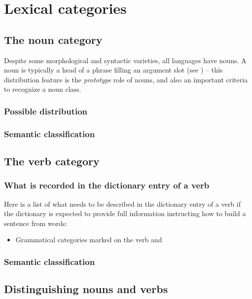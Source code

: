 \documentclass{article}
\begin{document}
\section{Lexical categories}

\subsection{The noun category}

Despite some morphological and syntactic varieties, 
all languages have nouns. 
A noun is typically a head of a phrase filling an argument slot (see )
-- this distribution feature is the \emph{prototype} role of nouns, 
and also an important criteria to recognize a noun class.

\subsubsection{Possible distribution}



\subsubsection{Semantic classification}

\subsection{The verb category}

\subsubsection{What is recorded in the dictionary entry of a verb}

Here is a list of what needs to be described in the dictionary entry of a verb
if the dictionary is expected to provide full information instructing 
how to build a sentence from words:
\begin{itemize}
    \item Grammatical categories marked on the verb and 
\end{itemize}

\subsubsection{Semantic classification}

\subsection{Distinguishing nouns and verbs}
\end{document}
